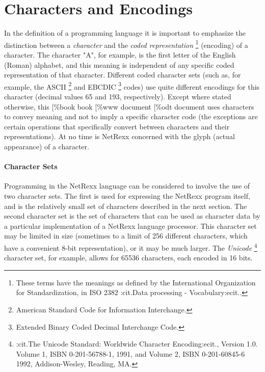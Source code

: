 \chapter{Characters and Encodings}\label{"id"}
 In the definition of a programming language it is important to
emphasize the distinction between a \emph{character} and the
\emph{coded representation}
\footnote{
These terms have the meanings as defined by the International
Organization for Standardization, in ISO 2382 :cit.Data processing
- Vocabulary:ecit..
}
(encoding) of a character.
The character "A", for example, is the first letter of the English
(Roman) alphabet, and this meaning is independent of any specific coded
representation of that character.
Different coded character sets (such as, for example, the ASCII
\footnote{
American Standard Code for Information Interchange.
}
and EBCDIC
\footnote{
Extended Binary Coded Decimal Interchange Code.
}
codes) use quite different encodings for this character (decimal
values 65 and 193, respectively).
 Except where stated otherwise, this
[\%book
book
[\%www
document
[\%odt
document
uses characters to convey meaning and not to imply a specific character
code (the exceptions are certain operations that specifically convert
between characters and their representations).
At no time is NetRexx concerned with the glyph (actual appearance) of
a character.
\subsubsection{Character Sets}
 Programming in the NetRexx language can be considered to involve the
use of two character sets.
The first is used for expressing the NetRexx program itself, and is the
relatively small set of characters described in the next section.
The second character set is the set of characters that can be used as
character data by a particular implementation of a NetRexx language
processor.
This character set may be limited in size (sometimes to a limit of 256
different characters, which have a convenient 8-bit representation), or
it may be much larger.  The \emph{Unicode}
\footnote{
:cit.The Unicode Standard: Worldwide Character Encoding:ecit.,
Version 1.0.  Volume 1, ISBN 0-201-56788-1, 1991, and Volume 2, ISBN
0-201-60845-6 1992, Addison-Wesley, Reading, MA.
}
character set, for example, allows for 65536 characters, each encoded in
16 bits.
 
